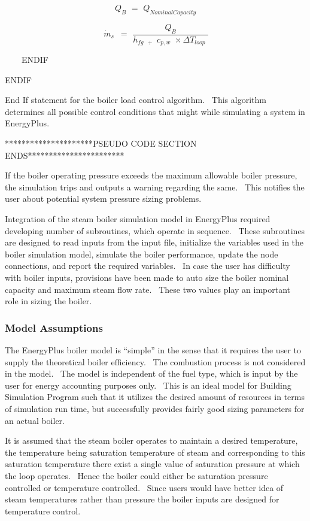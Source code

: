 \begin{equation}
{Q_B}\,\, = \,\,{Q_{NominalCapacity}}
\end{equation}

\begin{equation}
\,{\dot m_s}\,\,\, = \,\,\frac{{{Q_B}}}{{{h_{fg\,\,\, + }}\,\,{c_{p,w}}\,\, \times \Delta {T_{loop}}\,\,}}
\end{equation}

~~~~ENDIF

ENDIF

End If statement for the boiler load control algorithm.~ This algorithm determines all possible control conditions that might while simulating a system in EnergyPlus.

*********************PSEUDO CODE SECTION ENDS***********************

If the boiler operating pressure exceeds the maximum allowable boiler pressure, the simulation trips and outputs a warning regarding the same.~ This notifies the user about potential system pressure sizing problems.

Integration of the steam boiler simulation model in EnergyPlus required developing number of subroutines, which operate in sequence.~ These subroutines are designed to read inputs from the input file, initialize the variables used in the boiler simulation model, simulate the boiler performance, update the node connections, and report the required variables.~ In case the user has difficulty with boiler inputs, provisions have been made to auto size the boiler nominal capacity and maximum steam flow rate.~ These two values play an important role in sizing the boiler.

\subsubsection{Model Assumptions}\label{model-assumptions}

The EnergyPlus boiler model is ``simple'' in the sense that it requires the user to supply the theoretical boiler efficiency.~ The combustion process is not considered in the model.~ The model is independent of the fuel type, which is input by the user for energy accounting purposes only.~ This is an ideal model for Building Simulation Program such that it utilizes the desired amount of resources in terms of simulation run time, but successfully provides fairly good sizing parameters for an actual boiler.

It is assumed that the steam boiler operates to maintain a desired temperature, the temperature being saturation temperature of steam and corresponding to this saturation temperature there exist a single value of saturation pressure at which the loop operates.~ Hence the boiler could either be saturation pressure controlled or temperature controlled.~ Since users would have better idea of steam temperatures rather than pressure the boiler inputs are designed for temperature control.

